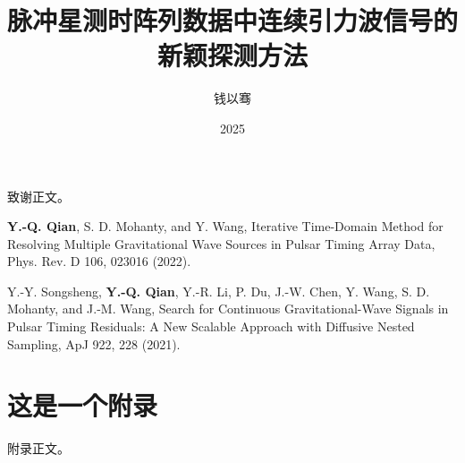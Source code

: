 \documentclass[format=draft,language=chinese,degree=phd]{hustthesis}
\title{脉冲星测时阵列数据中连续引力波信号的新颖探测方法}{Novel Method for Detecting Continuous Gravitational Waves in Pulsar Timing Array Data}
\author
{钱以骞}{Yiqian Qian}
\date{2025}{7}{1}
\begin{document}
\frontmatter
\maketitle
\makeabstract
\tableofcontents
\listoffigures
\listoftables
\mainmatter






\backmatter

\begin{ack}
致谢正文。
\end{ack}



\appendix

\begin{publications}
    \item \textbf{Y.-Q. Qian}, S. D. Mohanty, and Y. Wang, Iterative Time-Domain Method for Resolving Multiple Gravitational Wave Sources in Pulsar Timing Array Data, Phys. Rev. D 106, 023016 (2022).
    \item Y.-Y. Songsheng, \textbf{Y.-Q. Qian}, Y.-R. Li, P. Du, J.-W. Chen, Y. Wang, S. D. Mohanty, and J.-M. Wang, Search for Continuous Gravitational-Wave Signals in Pulsar Timing Residuals: A New Scalable Approach with Diffusive Nested Sampling, ApJ 922, 228 (2021).
    
\end{publications}

\chapter{这是一个附录}\label{appendix:1}
附录正文。
\end{document}
